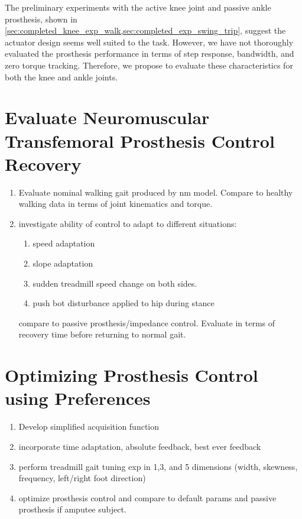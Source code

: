 The preliminary experiments with the active knee joint and passive ankle
prosthesis, shown in
\cref{sec:completed_knee_exp_walk,sec:completed_exp_swing_trip}, suggest the
actuator design seems well suited to the task. However, we have not thoroughly
evaluated the prosthesis performance in terms of step response, bandwidth, and
zero torque tracking. Therefore, we propose to evaluate these characteristics
for both the knee and ankle joints. 

\section{Evaluate Neuromuscular Transfemoral Prosthesis
Control Recovery}\label{sec:proposed_evaluate}

\begin{enumerate}
    \item Evaluate nominal walking gait produced by nm model. Compare to healthy
    walking data in terms of joint kinematics and torque.
    \item investigate ability of control to adapt to different situations:
    \begin{enumerate}
        \item speed adaptation
        \item slope adaptation
        \item sudden treadmill speed change on both sides.
        \item push bot disturbance applied to hip during stance
    \end{enumerate}
    compare to passive prosthesis/impedance control. Evaluate in terms of
    recovery time before returning to normal gait.
\end{enumerate}

\section{Optimizing Prosthesis Control using
Preferences}\label{sec:proposed_optimize}
\begin{enumerate}
    \item Develop simplified acquisition function
    \item incorporate time adaptation, absolute feedback, best ever feedback
    \item perform treadmill gait tuning exp in 1,3, and 5 dimensions (width,
    skewness, frequency, left/right foot direction)
    \item optimize prosthesis control and compare to default params and passive
    prosthesis if amputee subject.
\end{enumerate}

